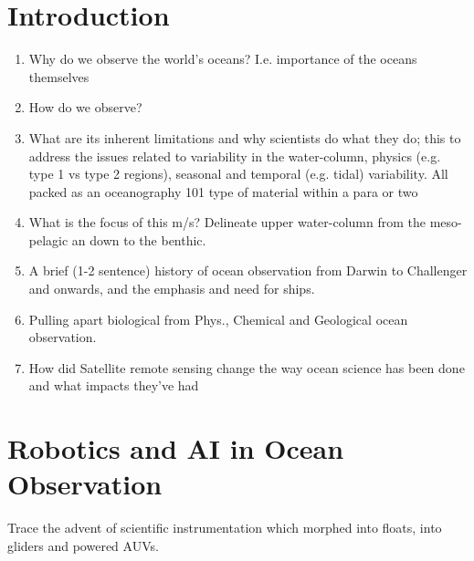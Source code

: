 \documentclass[12pt]{article}
\begin{document}
\section{Introduction}

\begin{enumerate} 

  \item Why do we observe the world's oceans? I.e. importance of the oceans
themselves

\item How do we observe?

\item What are its inherent limitations and why scientists do what
  they do; this to address the issues related to variability in the
  water-column, physics (e.g. type 1 vs type 2 regions), seasonal and
  temporal (e.g. tidal) variability. All packed as an oceanography 101
  type of material within a para or two

\item What is the focus of this m/s? Delineate upper water-column from the
meso-pelagic an down to the benthic.

\item A brief (1-2 sentence) history of ocean observation from Darwin to
Challenger and onwards, and the emphasis and need for ships.

\item Pulling apart biological from Phys., Chemical and Geological ocean
observation. 

\item How did Satellite remote sensing change the way ocean science has
been done and what impacts they've had

\end{enumerate}

\section{Robotics and AI in Ocean Observation}

Trace the advent of scientific instrumentation which morphed into
floats, into gliders and powered AUVs.
\end{document}
